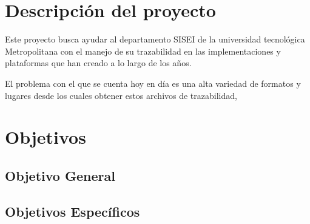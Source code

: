 \section{Descripción del proyecto}

Este proyecto busca ayudar al departamento SISEI de la universidad tecnológica Metropolitana con el manejo de su trazabilidad en las implementaciones y plataformas que han creado a lo largo de los años.

El problema con el que se cuenta hoy en día es una alta variedad de formatos y lugares desde los cuales obtener estos archivos de trazabilidad, 

\lipsum[2]

\section{Objetivos}
\subsection{Objetivo General}
\lipsum[1]

\subsection{Objetivos Específicos}
 

\clearpage
